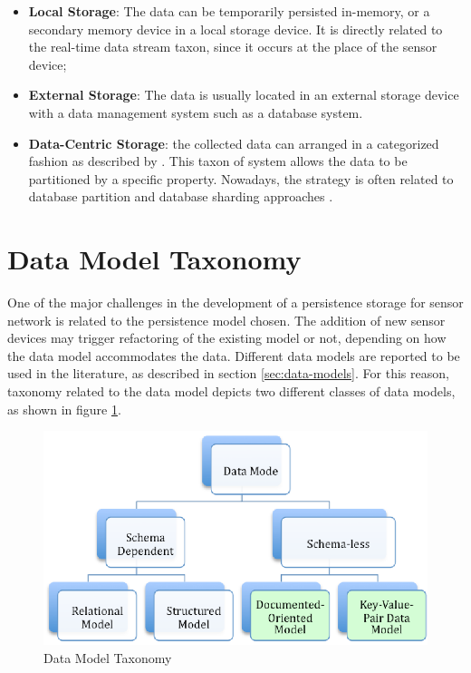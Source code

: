 \begin{itemize}
  \item \textbf{Local Storage}: The data can be temporarily persisted
   in-memory, or a secondary memory device in a local storage device. It is
  directly related to the real-time data stream taxon, since it occurs at
  the place of the sensor device;
  \item \textbf{External Storage}: The data is usually located in an
  external storage device with a data management system such as a database
  system.
  \item \textbf{Data-Centric Storage}: the collected data can arranged in a
  categorized fashion as described by \cite{sn-storage03}. This taxon of
  system allows the data to be partitioned by a specific property. Nowadays,
  the strategy is often related to database partition \cite{db-partition}
  and database sharding approaches \cite{db-shard01} \cite{db-shard02}.
\end{itemize}

\section{Data Model Taxonomy}

One of the major challenges in the development of a persistence storage for
sensor network is related to the persistence model chosen. The addition of new
sensor devices may trigger refactoring of the existing model or not, depending
on how the data model accommodates the data. Different data models are reported
to be used in the literature, as described in section \ref{sec:data-models}.
For this reason, taxonomy related to the data model depicts two different
classes of data models, as shown in figure \ref{fig:taxonomy-data-model}.

\begin{figure}[h]
  \centering
  \includegraphics{../diagrams/taxonomy-data-model}
  \caption{Data Model Taxonomy}
  \label{fig:taxonomy-data-model}
\end{figure}

